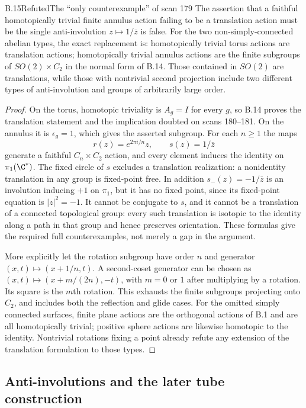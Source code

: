 \begin{claim}{B.15}{Refuted}{The ``only counterexample'' of scan 179}
The assertion that a faithful homotopically trivial finite annulus action
failing to be a translation action must be the single anti-involution
$z\mapsto1/\overline z$ is false. For the two non-simply-connected abelian
types, the exact replacement is: homotopically trivial torus actions are
translation actions; homotopically trivial annulus actions are the finite
subgroups of $SO(2)\times C_2$ in the normal form of B.14. Those contained in
$SO(2)$ are translations, while those with nontrivial second projection include
two different types of anti-involution and groups of arbitrarily large order.
\end{claim}
\begin{proof}
On the torus, homotopic triviality is $A_g=I$ for every $g$, so B.14 proves the
translation statement and the implication doubted on scans 180--181.
On the annulus it is $\epsilon_g=1$, which gives the asserted subgroup.
For each $n\ge1$ the maps
\[
 r(z)=e^{2\pi i/n}z,\qquad s(z)=1/\overline z
\]
generate a faithful $C_n\times C_2$ action, and every element induces the
identity on $\pi_1(\C^*)$. The fixed circle of $s$ excludes a translation
realization: a nonidentity translation in any group is fixed-point free.
In addition $s_-(z)=-1/\overline z$ is an involution inducing $+1$ on $\pi_1$,
but it has no fixed point, since its fixed-point equation is $|z|^2=-1$.
It cannot be conjugate to $s$, and it cannot be a translation of a connected
topological group: every such translation is isotopic to the identity along
a path in that group and hence preserves orientation. These formulas give the required full
counterexamples, not merely a gap in the argument.

More explicitly let the rotation subgroup have order $n$ and generator
$(x,t)\mapsto(x+1/n,t)$. A second-coset generator can be chosen as
$(x,t)\mapsto(x+m/(2n),-t)$, with $m=0$ or $1$ after multiplying by a rotation.
Its square is the $m$th rotation. This exhausts the finite subgroups projecting
onto $C_2$, and includes both the reflection and glide cases. For the omitted
simply connected surfaces, finite plane actions are the orthogonal actions of
B.1 and are all homotopically trivial; positive sphere actions are likewise
homotopic to the identity. Nontrivial rotations fixing a point already refute
any extension of the translation formulation to those types.
\end{proof}

\subsection{Anti-involutions and the later tube construction}

